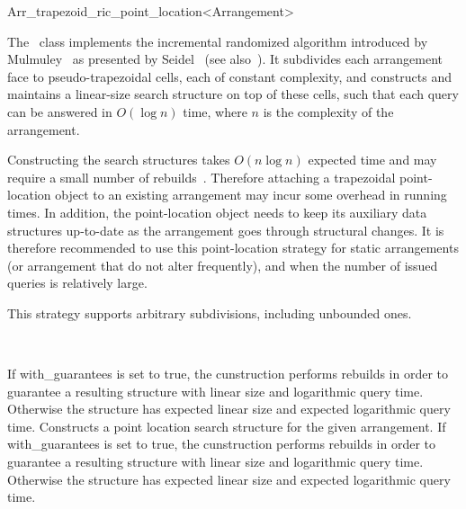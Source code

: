 
\ccRefPageBegin

\begin{ccRefClass}{Arr_trapezoid_ric_point_location<Arrangement>}
\label{arr_ref:trap_pl}

\ccDefinition
The \ccRefName\ class implements the incremental randomized algorithm
introduced by Mulmuley~\cite{m-fppa-90} as presented by
Seidel~\cite{s-sfira-91} (see also~\cite[Chapter~6]{bkos-cgaa-00}).
It subdivides each arrangement face to pseudo-trapezoidal cells, each
of constant complexity, and constructs and maintains a linear-size search
structure on top of these cells, such that each query can be answered
in $O(\log n)$ time, where $n$ is the complexity of the arrangement.

Constructing the search structures takes $O(n \log n)$ expected time 
and may require a small number of rebuilds~\cite{hkh-iiplgtds-12}. Therefore
attaching a trapezoidal point-location object to an existing arrangement
may incur some overhead in running times. In addition, the point-location
object needs to keep its auxiliary data structures up-to-date as the
arrangement goes through structural changes. It is therefore recommended
to use this point-location strategy for static arrangements (or arrangement
that do not alter frequently), and when the number of issued queries
is relatively large.

This strategy supports arbitrary subdivisions, including unbounded ones.


\ccIsModel
   \\

\ccCreation
{}

{If with\_guarantees is set to true, the cunstruction performs rebuilds in order to guarantee a resulting structure with linear size and logarithmic query time. Otherwise the structure has expected linear size and expected logarithmic query time.}
{Constructs a point location search structure for the given arrangement. If with\_guarantees is set to true, the cunstruction performs rebuilds in order to guarantee a resulting structure with linear size and logarithmic query time. Otherwise the structure has expected linear size and expected logarithmic query time.}


\end{ccRefClass}
